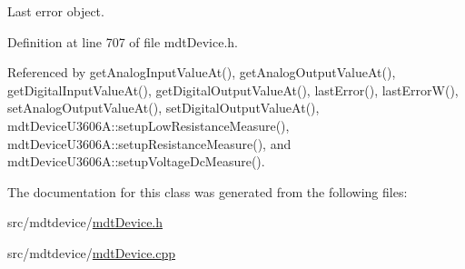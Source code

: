 Last error object. 



Definition at line 707 of file mdt\-Device.\-h.



Referenced by get\-Analog\-Input\-Value\-At(), get\-Analog\-Output\-Value\-At(), get\-Digital\-Input\-Value\-At(), get\-Digital\-Output\-Value\-At(), last\-Error(), last\-Error\-W(), set\-Analog\-Output\-Value\-At(), set\-Digital\-Output\-Value\-At(), mdt\-Device\-U3606\-A\-::setup\-Low\-Resistance\-Measure(), mdt\-Device\-U3606\-A\-::setup\-Resistance\-Measure(), and mdt\-Device\-U3606\-A\-::setup\-Voltage\-Dc\-Measure().



The documentation for this class was generated from the following files\-:\begin{DoxyCompactItemize}
\item 
src/mdtdevice/\hyperlink{mdt_device_8h}{mdt\-Device.\-h}\item 
src/mdtdevice/\hyperlink{mdt_device_8cpp}{mdt\-Device.\-cpp}\end{DoxyCompactItemize}
